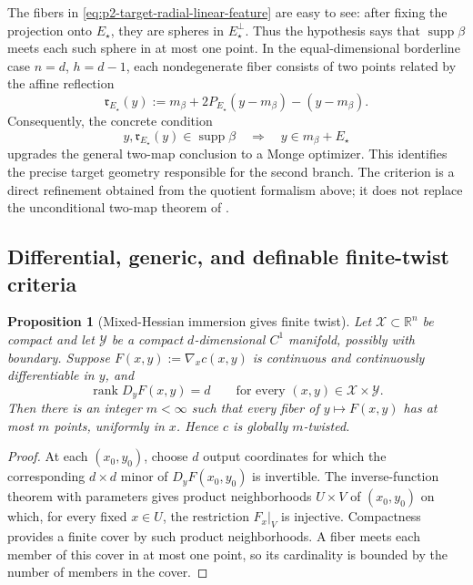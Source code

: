 \documentclass[11pt,a4paper]{article}
\newtheorem{proposition}[theorem]{Proposition}
\theoremstyle{definition}
\theoremstyle{remark}
\newcommand{\R}{\mathbb R}
\newcommand{\supp}{\operatorname{supp}}
\newcommand{\rank}{\operatorname{rank}}
\begin{document}
The fibers in \eqref{eq:p2-target-radial-linear-feature} are easy to see:
after fixing the projection onto \(E_\star\), they are spheres in
\(E_\star^\perp\).  Thus the hypothesis says that \(\supp\beta\) meets each
such sphere in at most one point.  In the equal-dimensional borderline case
\(n=d\), \(h=d-1\), each nondegenerate fiber consists of two points related by
the affine reflection
\begin{equation*}
  \mathfrak r_{E_\star}(y)
  :=m_\beta+2P_{E_\star}(y-m_\beta)-(y-m_\beta).
\end{equation*}
Consequently, the concrete condition
\begin{equation}
  y,\mathfrak r_{E_\star}(y)\in\supp\beta
  \quad\Longrightarrow\quad y\in m_\beta+E_\star
  \label{eq:p2-no-reflected-target-pairs}
\end{equation}
upgrades the general two-map conclusion to a Monge optimizer.  This identifies
the precise target geometry responsible for the second branch.  The criterion
is a direct refinement obtained from the quotient formalism above; it does not
replace the unconditional two-map theorem of
\citet{DumontLacombeVialard2025}.

\subsection{Differential, generic, and definable finite-twist criteria}

\begin{proposition}[Mixed-Hessian immersion gives finite twist]
\label{prop:mixed-hessian-finite-twist}
Let \(\mathcal X\subset\R^n\) be compact and let \(\mathcal Y\) be a compact
\(d\)-dimensional \(C^1\) manifold, possibly with boundary.  Suppose
\(F(x,y):=\nabla_xc(x,y)\) is continuous and continuously differentiable in
\(y\), and
\begin{equation}
  \rank D_yF(x,y)=d
  \qquad\text{for every }(x,y)\in\mathcal X\times\mathcal Y.
  \label{eq:mixed-hessian-full-column-rank}
\end{equation}
Then there is an integer \(m<\infty\) such that every fiber of
\(y\mapsto F(x,y)\) has at most \(m\) points, uniformly in \(x\).  Hence \(c\)
is globally \(m\)-twisted.
\end{proposition}

\begin{proof}
At each \((x_0,y_0)\), choose \(d\) output coordinates for which the
corresponding \(d\times d\) minor of \(D_yF(x_0,y_0)\) is invertible.  The
inverse-function theorem with parameters gives product neighborhoods
\(U\times V\) of \((x_0,y_0)\) on which, for every fixed \(x\in U\), the
restriction \(F_x|_V\) is injective.  Compactness provides a finite cover by
such product neighborhoods.  A fiber meets each member of this cover in at
most one point, so its cardinality is bounded by the number of members in the
cover.
\end{proof}
\end{document}
